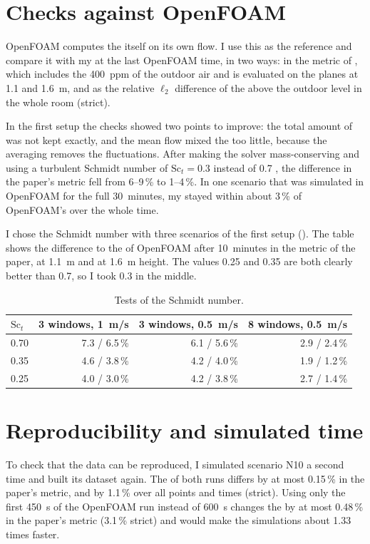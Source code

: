 \section{Checks against OpenFOAM}
OpenFOAM computes the \cotwo{} itself on its own flow. I use this as the reference and compare it with my
\cotwo{} at the last OpenFOAM time, in two ways: in the metric of \citet{bian2025}, which includes the
400~ppm of the outdoor air and is evaluated on the planes at 1.1 and 1.6~m, and as the relative $\ell_2$
difference of the \cotwo{} above the outdoor level in the whole room (strict).

In the first setup the checks showed two points to improve: the total amount of \cotwo{} was not kept exactly, and
the mean flow mixed the \cotwo{} too little, because the averaging removes the fluctuations. After making the
solver mass-conserving and using a turbulent Schmidt number of $\mathrm{Sc}_t=0.3$ instead of 0.7
\citep{tominaga2007}, the difference in the paper's metric fell from 6--9\,\% to 1--4\,\%. In one scenario
that was simulated in OpenFOAM for the full 30~minutes, my \cotwo{} stayed within about 3\,\% of OpenFOAM's
over the whole time.

I chose the Schmidt number with three scenarios of the first setup (). The table shows the
difference to the \cotwo{} of OpenFOAM after 10~minutes in the metric of the paper, at 1.1~m and at 1.6~m
height. The values 0.25 and 0.35 are both clearly better than 0.7, so I took 0.3 in the middle.

\begin{table}[h]
  \centering
  \caption{Tests of the Schmidt number.}
  \label{tab:sct}
  \begin{tabular}{lrrr}
    \toprule
    $\mathrm{Sc}_t$ & 3 windows, 1~m/s & 3 windows, 0.5~m/s & 8 windows, 0.5~m/s\\
    \midrule
    0.70 & 7.3 / 6.5\,\% & 6.1 / 5.6\,\% & 2.9 / 2.4\,\%\\
    0.35 & 4.6 / 3.8\,\% & 4.2 / 4.0\,\% & 1.9 / 1.2\,\%\\
    0.25 & 4.0 / 3.0\,\% & 4.2 / 3.8\,\% & 2.7 / 1.4\,\%\\
    \bottomrule
  \end{tabular}
\end{table}

\section{Reproducibility and simulated time}
To check that the data can be reproduced, I simulated scenario N10 a second time
and built its dataset again. The \cotwo{} of both runs differs by at most 0.15\,\% in the paper's metric, and by
1.1\,\% over all points and times (strict). Using only the first 450~s of the OpenFOAM run instead of 600~s
changes the \cotwo{} by at most 0.48\,\% in the paper's metric (3.1\,\% strict) and would make the simulations
about 1.33 times faster.

